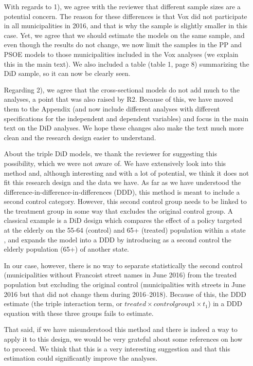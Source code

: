 \documentclass[12pt, a4paper, notitlepage]{article}
\begin{document}
With regards to 1), we agree with the reviewer that different sample sizes are a potential concern. The reason for these differences is that Vox did not participate in all municipalities in 2016, and that is why the sample is slightly smaller in this case.
Yet, we agree that we should estimate the models on the same sample, and even though the results do not change, we now limit the samples in the PP and PSOE models to those municipalities included in the Vox analyses (we explain this in the main text). We also included a table (table 1, page 8) summarizing the DiD sample, so it can now be clearly seen.

Regarding 2), we agree that the cross-sectional models do not add much to the analyses, a point that was also raised by R2. Because of this, we have moved them to the Appendix (and now include different analyses with different specifications for the independent and dependent variables) and focus in the main text on the DiD analyses. We hope these changes also make the text much more clean and the research design easier to understand.

About the triple DiD models, we thank the reviewer for suggesting this possibility, which we were not aware of.
We have extensively look into this method and, although interesting and with a lot of potential, we think it does not fit this research design and the data we have.
As far as we have understood the difference-in-difference-in-differences (DDD), this method is meant to include a second control category. However, this second control group needs to be linked to the treatment group in some way that excludes the original control group. A classical example is a DiD design which compares the effect of a policy targeted at the elderly on the 55-64 (control) and 65+ (treated) population within a state \citep[see][150--151]{Wooldridge:2010aa}, and expands the model into a DDD by introducing as a second control the elderly population (65+) of another state.

In our case, however, there is no way to separate statistically the second control (municipalities without Francoist street names in June 2016) from the treated population but excluding the original control (municipalities with streets in June 2016 but that did not change them during 2016--2018).
Because of this, the DDD estimate (the triple interaction term, or $treated \times controlgroup1 \times t_{1}$) in a DDD equation with these three groups fails to estimate.

That said, if we have misunderstood this method and there is indeed a way to apply it to this design, we would be very grateful about some references on how to proceed. We think that this is a very interesting suggestion and that this estimation could significantly improve the analyses.
\end{document}
